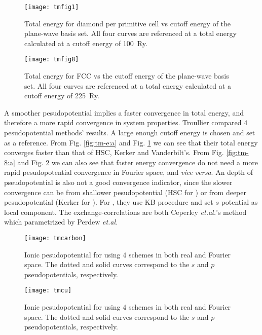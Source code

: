\begin{figure}[H]
	\centering
	\begin{minipage}[t]{.46\linewidth}
		\centering
		\texttt{[image: tmfig1]}
		\caption{Total energy for diamond per primitive cell vs cutoff energy
			of the plane-wave basis set. All four curves are referenced at a total
			energy calculated at a cutoff energy of \SI{100}{Ry}.
			\cite{Troullier:1991ey}}
		\label{fig:tm-e:a}
	\end{minipage}%
	\hfil
	\begin{minipage}[t]{.46\linewidth}
		\centering
		\texttt{[image: tmfig8]}
		\caption{Total energy for FCC  vs the cutoff energy
			of the plane-wave basis set. All four curves are referenced at a total
			energy calculated at a cutoff energy of \SI{225}{Ry}.
			\cite{Troullier:1991ey}}
		\label{fig:tm-e:b}
	\end{minipage}
\end{figure}
A smoother pesudopotential implies a faster convergence in
total energy, and therefore a more rapid convergence in system properties.
Troullier\cite{Troullier:1991ey} compared $4$ pesudopotential methods'
results. A large enough cutoff energy is chosen and set as a reference.
From Fig. \ref{fig:tm-e:a} and Fig. \ref{fig:tm-e:b} we can see that their
total energy converges faster than that of HSC, Kerker and Vanderbilt's.
From Fig. \ref{fig:tm-8:a} and Fig. \ref{fig:tm-8:b} we can also see that
faster energy convergence do not need a more rapid pesudopotential
convergence in Fourier space, and \emph{vice versa}.
An depth of pseudopotential is also not a good convergence indicator,
since the slower convergence can be from shallower pesudopotential (HSC for )
or from deeper pesudopotential (Kerker for ).
For , they use KB procedure and set $s$ potential as local component.
The exchange-correlations are both Ceperley \textit{et.al.}\cite{ceperley1980ground}'s method which parametrized by Perdew \textit{et.al.}\cite{perdew1981self}
\begin{figure}[H]
	\centering
	\begin{minipage}[b]{.7\linewidth}
		\centering
		\texttt{[image: tmcarbon]}
		\caption{Ionic pesudopotential for  using $4$ schemes in both real and Fourier space.
			The dotted and solid curves correspond to the $s$ and $p$ pseudopotentials, respectively.
			\cite{Troullier:1991ey}}
		\label{fig:tm-8:a}
	\end{minipage}%
	\vspace{\baselineskip}
	\begin{minipage}[b]{.7\linewidth}
		\centering
		\texttt{[image: tmcu]}
		\caption{Ionic pesudopotential for  using $4$ schemes in both real and Fourier space.
			The dotted and solid curves correspond to the $s$ and $p$ pseudopotentials, respectively.
			\cite{Troullier:1991ey}}
		\label{fig:tm-8:b}
	\end{minipage}
\end{figure}

